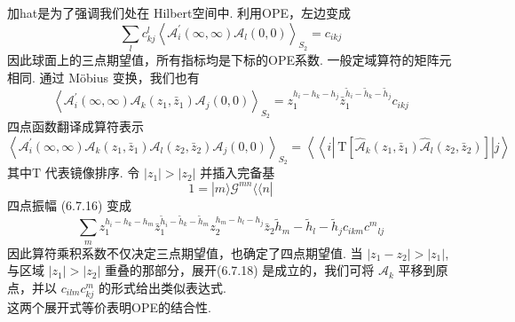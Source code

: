 加hat是为了强调我们处在 Hilbert空间中. 利用OPE，左边变成
\begin{equation}
	\sum_{l} c_{k j}^{l}\left\langle\mathscr{A}_{i}^{\prime}(\infty, \infty) \mathscr{A}_{l}(0,0)\right\rangle_{S_{2}}=c_{i k j}
\end{equation}
因此球面上的三点期望值，所有指标均是下标的OPE系数. 一般定域算符的矩阵元相同. 通过 Möbius 变换，我们也有
\begin{equation}
	\left\langle\mathscr{A}_{i}^{\prime}(\infty, \infty) \mathscr{A}_{k}\left(z_{1}, \bar{z}_{1}\right) \mathscr{A}_{j}(0,0)\right\rangle_{S_{2}}=z_{1}^{h_{i}-h_{k}-h_{j}} \bar{z}_{1}^{\tilde{h}_{i}-\tilde{h}_{k}-\tilde{h}_{j}} c_{i k j}
\end{equation}
四点函数翻译成算符表示
\begin{equation}
	\left\langle\mathscr{A}_{i}^{\prime}(\infty, \infty) \mathscr{A}_{k}\left(z_{1}, \bar{z}_{1}\right) \mathscr{A}_{l}\left(z_{2}, \bar{z}_{2}\right) \mathscr{A}_{j}(0,0)\right\rangle_{S_{2}}=\left\langle\left\langle i\left|\mathrm{~T}\left[\hat{\mathscr{A}}_{k}\left(z_{1}, \bar{z}_{1}\right) \hat{\mathscr{A}}_{l}\left(z_{2}, \bar{z}_{2}\right)\right]\right| j\right\rangle\right.
\end{equation}
其中$\mathrm{T}$ 代表镜像排序. 令 $\left|z_{1}\right|>\left|z_{2}\right|$ 并插入完备基
\begin{equation}
	1=|m\rangle \mathscr{G}^{m n}\langle\langle n|
\end{equation}
四点振幅 (6.7.16) 变成
\begin{equation}
	\sum_{m} z_{1}^{h_{i}-h_{k}-h_{m}} \bar{z}_{1}^{\tilde{h}_{i}-\tilde{h}_{k}-\tilde{h}_{m}} z_{2}^{h_{m}-h_{l}-h_{j}} \bar{z}_{2} \tilde{h}_{m}-\tilde{h}_{l}-\tilde{h}_{j} c_{i k m} c^{m}{ }_{l j}
\end{equation}
因此算符乘积系数不仅决定三点期望值，也确定了四点期望值. 当 $\left|z_{1}-z_{2}\right|>\left|z_{1}\right|$, 与区域 $\left|z_{1}\right|>\left|z_{2}\right|$ 重叠的那部分，展开(6.7.18) 是成立的，我们可将 $\mathscr{A}_{k}$ 平移到原点，并以 $c_{i l m} c^{m}_{k j} $ 的形式给出类似表达式.\\
这两个展开式等价表明OPE的结合性.\\

